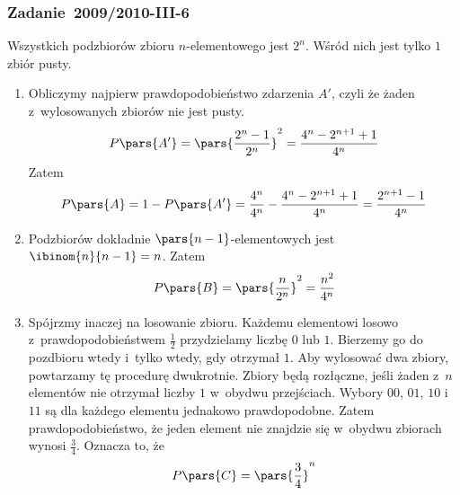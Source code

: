 \subsubsection*{Zadanie~2009/2010-III-6}
Wszystkich podzbiorów zbioru \(n\)-elementowego jest \(2^n\). Wśród nich jest tylko \(1\) zbiór pusty.
\begin{enumerate}[label={\Alph*:}]
    \item Obliczymy najpierw prawdopodobieństwo zdarzenia \(A'\), czyli że żaden z~wylosowanych zbiorów nie jest pusty.
        \begin{equation*}
            P\pars{A'}
            = \pars{\frac{2^n - 1}{2^n}}^2
            = \frac{4^n - 2^{n + 1} + 1}{4^n}
        \end{equation*}
        Zatem
        \begin{equation*}
            P\pars{A}
            = 1 - P\pars{A'}
            = \frac{4^n}{4^n} - \frac{4^n - 2^{n + 1} + 1}{4^n}
            = \frac{2^{n + 1} - 1}{4^n}
        \end{equation*}
    \item Podzbiorów dokładnie \(\pars{n - 1}\)-elementowych jest \(\ibinom{n}{n - 1} = n\). Zatem
        \begin{equation*}
            P\pars{B}
            = \pars{\frac{n}{2^n}}^2
            = \frac{n^2}{4^n}
        \end{equation*}
    \item Spójrzmy inaczej na losowanie zbioru. Każdemu elementowi losowo z~prawdopodobieństwem \(\frac{1}{2}\) przydzielamy liczbę \(0\) lub \(1\). Bierzemy go do pozdbioru wtedy i~tylko wtedy, gdy otrzymał \(1\). Aby wylosować dwa zbiory, powtarzamy tę procedurę dwukrotnie. Zbiory będą rozłączne, jeśli żaden z~\(n\) elementów nie otrzymał liczby \(1\) w~obydwu przejściach. Wybory \(00\), \(01\), \(10\) i~\(11\) są dla każdego elementu jednakowo prawdopodobne. Zatem prawdopodobieństwo, że jeden element nie znajdzie się w~obydwu zbiorach wynosi \(\frac{3}{4}\). Oznacza to, że
        \begin{equation*}
            P\pars{C}
            = \pars{\frac{3}{4}}^n
        \end{equation*}
\end{enumerate}
